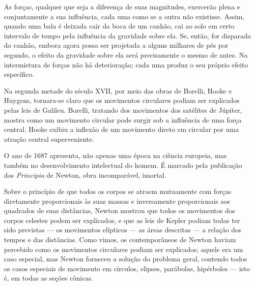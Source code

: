\documentclass[11pt,a5paper,twoside,openany]{book}
\begin{document}
As forças, qualquer que seja a diferença de suas magnitudes, exercerão plena e conjuntamente a sua influência, cada uma como se a outra não existisse. Assim, quando uma bala é deixada cair da boca de um canhão, cai ao solo em certo intervalo de tempo pela influência da gravidade sobre ela. Se, então, for disparada do canhão, embora agora possa ser projetada a alguns milhares de pés por segundo, o efeito da gravidade sobre ela será precisamente o mesmo de antes. Na intermistura de forças não há deterioração; cada uma produz o seu próprio efeito específico.

Na segunda metade do século XVII, por meio das obras de Borelli, Hooke e Huygens, tornara-se claro que os movimentos circulares podiam ser explicados pelas leis de Galileu. Borelli, tratando dos movimentos dos satélites de Júpiter, mostra como um movimento circular pode surgir sob a influência de uma força central. Hooke exibiu a inflexão de um movimento direto em circular por uma atração central superveniente.

O ano de 1687 apresenta, não apenas uma época na ciência europeia, mas também no desenvolvimento intelectual do homem. É marcado pela publicação dos \textit{Principia} de Newton, obra incomparável, imortal.

Sobre o princípio de que todos os corpos se atraem mutuamente com forças diretamente proporcionais às suas massas e inversamente proporcionais aos quadrados de suas distâncias, Newton mostrou que todos os movimentos dos corpos celestes podem ser explicados, e que as leis de Kepler podiam todas ter sido previstas — os movimentos elípticos — as áreas descritas — a relação dos tempos e das distâncias. Como vimos, os contemporâneos de Newton haviam percebido como os movimentos circulares podiam ser explicados; aquele era um caso especial, mas Newton forneceu a solução do problema geral, contendo todos os casos especiais de movimento em círculos, elipses, parábolas, hipérboles — isto é, em todas as seções cônicas.
\end{document}
